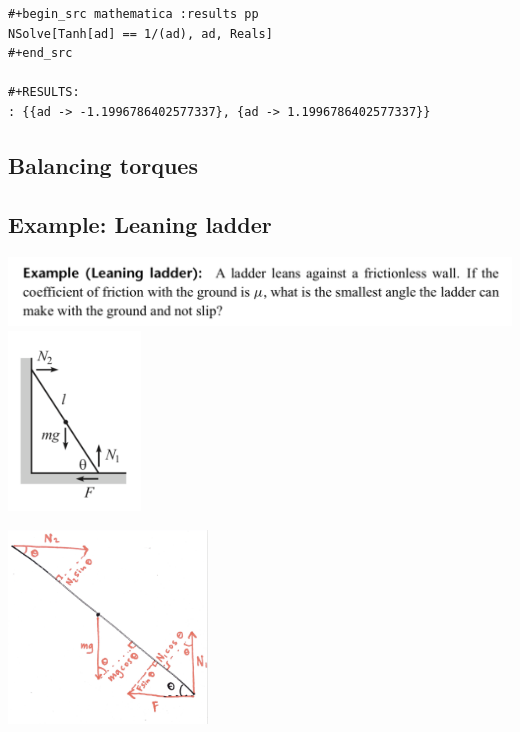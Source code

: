 \begin{verbatim}
#+begin_src mathematica :results pp
NSolve[Tanh[ad] == 1/(ad), ad, Reals]
#+end_src

#+RESULTS:
: {{ad -> -1.1996786402577337}, {ad -> 1.1996786402577337}}
\end{verbatim}



\newpage

\subsection*{Balancing torques}

\subsection*{Example: Leaning ladder}
\begin{mdframed}
  \includegraphics[width=400pt]{img/physics--classical-mechanics--morin--2--torque-example.png}\\
  \includegraphics[width=100pt]{img/physics--classical-mechanics--morin--2--torque-example-diag.png}
\end{mdframed}

\includegraphics[width=150pt]{img/physics--classical-mechanics--morin--2--torque-example-diag-2.png}

